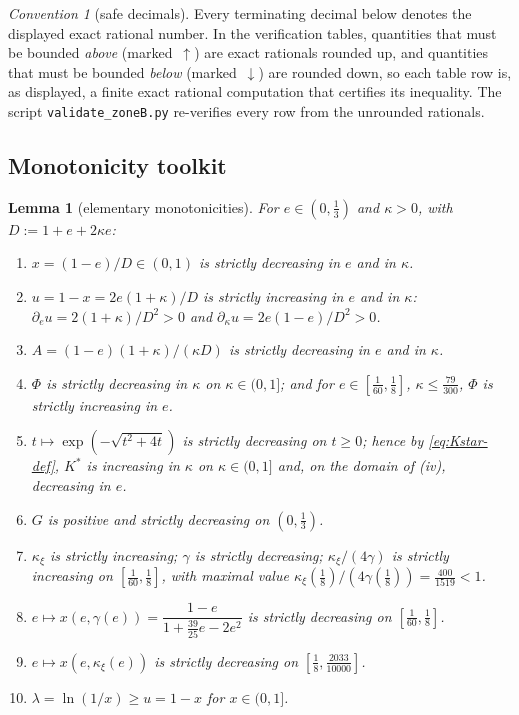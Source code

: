 \documentclass[11pt]{article}
\newtheorem{lemma}[theorem]{Lemma}
\theoremstyle{remark}
\newtheorem{convention}[theorem]{Convention}
\theoremstyle{plain}
\theoremstyle{plain}
\newcommand{\Kstar}{K^{*}}
\newcommand{\kxi}{\kappa_\xi}
\begin{document}
\begin{convention}[safe decimals]\label{conv:zb-safe}
Every terminating decimal below denotes the displayed exact rational
number.  In the verification tables, quantities that must be bounded
\emph{above} (marked~$\uparrow$) are exact rationals rounded up, and
quantities that must be bounded \emph{below} (marked~$\downarrow$) are
rounded down, so each table row is, as displayed, a finite exact rational
computation that certifies its inequality.  The script
\texttt{validate\_zoneB.py} re-verifies every row from the unrounded
rationals.
\end{convention}

\subsection{Monotonicity toolkit}

\begin{lemma}[elementary monotonicities]\label{lem:zb-mono}
For $e\in(0,\tfrac13)$ and $\kappa>0$, with $D:=1+e+2\kappa e$:
\begin{enumerate}[label=\textup{(\roman*)},itemsep=1pt]
\item $x=(1-e)/D\in(0,1)$ is strictly decreasing in $e$ and in $\kappa$.
\item $u=1-x=2e(1+\kappa)/D$ is strictly increasing in $e$ and in $\kappa$:
$\partial_e u=2(1+\kappa)/D^2>0$ and $\partial_\kappa u=2e(1-e)/D^2>0$.
\item $A=(1-e)(1+\kappa)/(\kappa D)$ is strictly decreasing in $e$ and in
$\kappa$.
\item $\Phi$ is strictly decreasing in $\kappa$ on $\kappa\in(0,1]$;
and for $e\in[\tfrac1{60},\tfrac18]$, $\kappa\le\tfrac{79}{300}$, $\Phi$ is
strictly increasing in $e$.
\item $t\mapsto\exp(-\sqrt{t^2+4t})$ is strictly decreasing on $t\ge0$;
hence by \eqref{eq:Kstar-def}, $\Kstar$ is increasing in $\kappa$ on
$\kappa\in(0,1]$ and, on the domain of \textup{(iv)}, decreasing in $e$.
\item $G$ is positive and strictly decreasing on $(0,\tfrac13)$.
\item $\kxi$ is strictly increasing; $\gamma$ is strictly decreasing;
$\kxi/(4\gamma)$ is strictly increasing on $[\tfrac1{60},\tfrac18]$, with
maximal value $\kxi(\tfrac18)/(4\gamma(\tfrac18))=\tfrac{400}{1519}<1$.
\item $e\mapsto x(e,\gamma(e))=\dfrac{1-e}{1+\tfrac{39}{25}e-2e^2}$ is
strictly decreasing on $[\tfrac1{60},\tfrac18]$.
\item $e\mapsto x(e,\kxi(e))$ is strictly decreasing on
$[\tfrac18,\tfrac{2033}{10000}]$.
\item $\lambda=\ln(1/x)\ge u=1-x$ for $x\in(0,1]$.
\end{enumerate}
\end{lemma}
\end{document}
